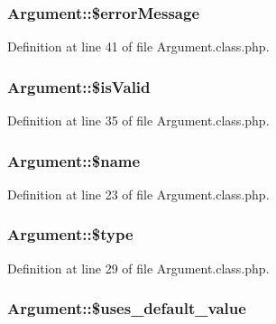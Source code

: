 \subsubsection[{\$error\+Message}]{\setlength{\rightskip}{0pt plus 5cm}Argument\+::\$error\+Message}\label{classArgument_ad0af83b11507626a9c95fd188e60b592}


Definition at line 41 of file Argument.\+class.\+php.

\hypertarget{classArgument_af1a5d4055fd3e16bea7951843a3bdd92}{}
\subsubsection[{\$is\+Valid}]{\setlength{\rightskip}{0pt plus 5cm}Argument\+::\$is\+Valid}\label{classArgument_af1a5d4055fd3e16bea7951843a3bdd92}


Definition at line 35 of file Argument.\+class.\+php.

\hypertarget{classArgument_ab37a45cb92464255505b2f4f35909da6}{}
\subsubsection[{\$name}]{\setlength{\rightskip}{0pt plus 5cm}Argument\+::\$name}\label{classArgument_ab37a45cb92464255505b2f4f35909da6}


Definition at line 23 of file Argument.\+class.\+php.

\hypertarget{classArgument_a7a2272bc3d12787f80143fbea01698f4}{}
\subsubsection[{\$type}]{\setlength{\rightskip}{0pt plus 5cm}Argument\+::\$type}\label{classArgument_a7a2272bc3d12787f80143fbea01698f4}


Definition at line 29 of file Argument.\+class.\+php.

\hypertarget{classArgument_a3f8f20477043da002ba9d48ede482baf}{}
\subsubsection[{\$uses\+\_\+default\+\_\+value}]{\setlength{\rightskip}{0pt plus 5cm}Argument\+::\$uses\+\_\+default\+\_\+value}\label{classArgument_a3f8f20477043da002ba9d48ede482baf}


